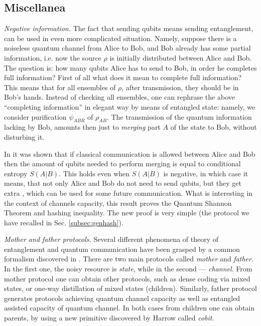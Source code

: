 \documentclass[rmp,12pt,preprint]{revtex4-2}
\begin{document}
\subsection{Miscellanea}
{\it Negative information.} The fact that sending qubits means
sending entanglement, can be used in even more complicated
situation. Namely, suppose there is a noiseless quantum channel from
Alice to Bob, and Bob already has some partial information, i.e. now
the source $\rho$ is initially distributed between Alice and Bob.
The question is: how many qubits Alice has to send to Bob, in order
he completes full information? First of all what does it mean to
complete full information? This means that for all ensembles of
$\rho$, after transmission, they should be in Bob's hands.
Instead of checking all ensembles, one can rephrase
the above ``completing information'' in elegant
way by means of entangled state: namely, we consider purification
$\psi_{ABR}$ of $\rho_{AB}$. The transmission of the quantum
information lacking by Bob, amounts then just to {\it merging} part $A$ of
the state to Bob, without disturbing it.

In \cite{SW-nature,sw-long} it was shown that if classical
communication is allowed between Alice and Bob then the amount of
qubits needed to perform merging is equal to conditional entropy
$S(A|B)$. This holds even when $S(A|B)$ is negative, in which case
it means, that not only Alice and Bob do not need to send qubits,
but they get extra \eprpairs, which can be used for some future
communication. What is interesting in the context of channels
capacity, this result proves the Quantum Shannon Theorem and hashing
inequality.  The new proof is very simple (the protocol we have recalled in Sec. \ref{subsec:genhash}).



{\it Mother and father protocols.}
Several different phenomena of theory of entanglement
and quantum communication have been grasped by a
common formalism discovered in \cite{DevetakHW-family,DevetakHW2005-resource}.
There are two main protocols  called {\it mother} and {\it father}. In the first one,
the noisy resource is {\it state}, while in the second --- {\it channel}.
From mother protocol one can obtain other protocols, such as dense coding via
mixed states, or one-way distillation of mixed states (children).
Similarly, father protocol generates protocols achieving quantum
channel capacity as well as entangled assisted capacity of quantum
channel. In both cases  from children one can obtain parents, by
using a new primitive discovered by Harrow called {\it cobit}.
\end{document}
